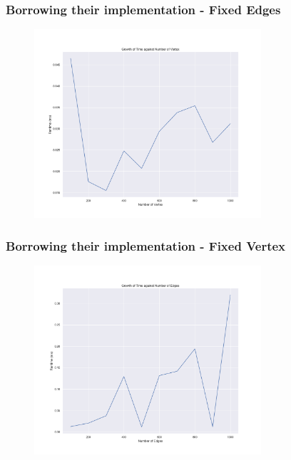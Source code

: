 \documentclass{beamer}
\begin{document}
\begin{frame}
	\frametitle{Borrowing their implementation - Fixed Edges}
	\begin{figure}
		\centering
		\includegraphics[width=0.75\textwidth]{pict/Q3_fixedEdges.png}
	\end{figure}
\end{frame}

\begin{frame}
	\frametitle{Borrowing their implementation - Fixed Vertex}
	\begin{figure}
		\centering
		\includegraphics[width=0.75\textwidth]{pict/Q3_fixedVertex.png}
	\end{figure}
\end{frame}
\end{document}
